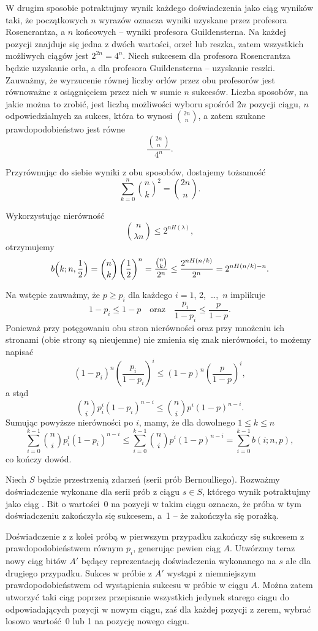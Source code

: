 W drugim sposobie potraktujmy wynik każdego doświadczenia jako  ciąg wyników taki, że początkowych $n$ wyrazów oznacza wyniki uzyskane przez profesora Rosencrantza, a $n$ końcowych -- wyniki profesora Guildensterna. Na każdej pozycji znajduje się jedna z dwóch wartości, orzeł lub reszka, zatem wszystkich możliwych ciągów jest $2^{2n}=4^n$. Niech sukcesem dla profesora Rosencrantza będzie uzyskanie orła, a dla profesora Guildensterna -- uzyskanie reszki. Zauważmy, że wyrzucenie równej liczby orłów przez obu profesorów jest równoważne z osiągnięciem przez nich w sumie $n$ sukcesów. Liczba sposobów, na jakie można to zrobić, jest liczbą możliwości wyboru spośród $2n$ pozycji ciągu, $n$ odpowiedzialnych za sukces, która to wynosi $\binom{2n}{n}$, a zatem szukane prawdopodobieństwo jest równe
\[
	\frac{\binom{2n}{n}}{4^n}.
\]

Przyrównując do siebie wyniki z obu sposobów, dostajemy tożsamość
\[
	\sum_{k=0}^n\binom{n}{k}^2 = \binom{2n}{n}.
\]

\exercise{} %
Wykorzystując nierówność
\[
	\binom{n}{\lambda n} \le 2^{nH(\lambda)},
\]
otrzymujemy
\[
	b\Bigl(k;n,\frac{1}{2}\Bigr) = \binom{n}{k}\left(\frac{1}{2}\right)^n = \frac{\binom{n}{k}}{2^n} \le \frac{2^{nH(n/k)}}{2^n} = 2^{nH(n/k)-n}.
\]

\exercise{} %
Na wstępie zauważmy, że $p\ge p_i$ dla każdego $i=1$, 2,~\dots,~$n$ implikuje
\[
	1-p_i \le 1-p \quad\text{oraz}\quad \frac{p_i}{1-p_i}\le\frac{p}{1-p}.
\]
Ponieważ przy potęgowaniu obu stron nierówności oraz przy mnożeniu ich stronami (obie strony są nieujemne) nie zmienia się znak nierówności, to możemy napisać
\[
	(1-p_i)^n\left(\frac{p_i}{1-p_i}\right)^i \le (1-p)^n\left(\frac{p}{1-p}\right)^i,
\]
a stąd
\[
	\binom{n}{i}p_i^i(1-p_i)^{n-i} \le \binom{n}{i}p^i(1-p)^{n-i}.
\]
Sumując powyższe nierówności po $i$, mamy, że dla dowolnego $1\le k\le n$
\[
	\sum_{i=0}^{k-1}\binom{n}{i}p_i^i(1-p_i)^{n-i} \le \sum_{i=0}^{k-1}\binom{n}{i}p^i(1-p)^{n-i} = \sum_{i=0}^{k-1}b(i;n,p),
\]
co kończy dowód.

\exercise{} %
Niech $S$ będzie przestrzenią zdarzeń (serii prób Bernoulliego). Rozważmy doświadczenie wykonane dla serii prób z ciągu $s\in S$, którego wynik potraktujmy jako ciąg . Bit o wartości~0 na  pozycji w takim ciągu oznacza, że  próba w tym doświadczeniu zakończyła się sukcesem, a~1 -- że zakończyła się porażką.

Doświadczenie z  z kolei próbą w pierwszym przypadku zakończy się sukcesem z prawdopodobieństwem równym $p_i$, generując pewien ciąg $A$. Utwórzmy teraz nowy ciąg bitów $A'$ będący reprezentacją doświadczenia wykonanego na $s$ ale dla drugiego przypadku. Sukces w  próbie z $A'$ wystąpi z niemniejszym prawdopodobieństwem od wystąpienia sukcesu w  próbie w ciągu $A$. Można zatem utworzyć taki ciąg poprzez przepisanie wszystkich jedynek starego ciągu do odpowiadających pozycji w nowym ciągu, zaś dla każdej pozycji z zerem, wybrać losowo wartość~0 lub 1 na pozycję nowego ciągu.

